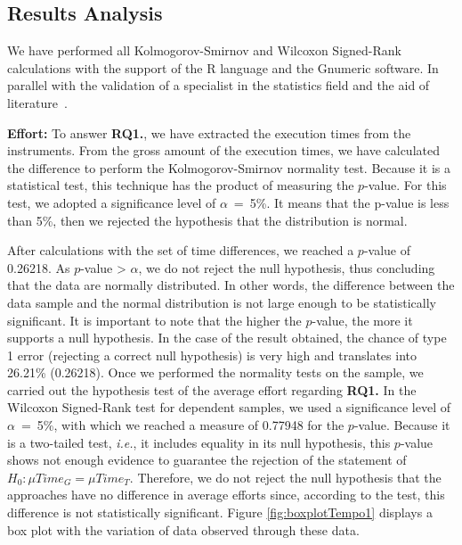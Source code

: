 \subsection{Results Analysis}
\label{ssec_experiments:preliminary_resultAnalysis}

We have performed all Kolmogorov-Smirnov and Wilcoxon Signed-Rank calculations with the support of the R language and the Gnumeric software. In parallel with the validation of a specialist in the statistics field and the aid of literature~\cite{Triola:2018}.

\textbf{Effort:} 
To answer \textbf{RQ1.},  
we have extracted the execution times from the instruments.
From the gross amount of the execution times, we have calculated the difference to perform the Kolmogorov-Smirnov normality test.
Because it is a statistical test, this technique has the product of measuring the $p$-value.
For this test, we adopted a significance level of $\alpha$~=~5\%.
It means that the p-value is less than 5\%, then we rejected the hypothesis that the distribution is normal.

After calculations with the set of time differences, we reached a $p$-value of 0.26218.
As $p$-value > $\alpha$, we do not reject the null hypothesis, thus concluding that the data are normally distributed.
In other words, the difference between the data sample and the normal distribution is not large enough to be statistically significant.
It is important to note that the higher the $p$-value, the more it supports a null hypothesis.
In the case of the result obtained, the chance of type 1 error (rejecting a correct null hypothesis) is very high and translates into 26.21\% (0.26218).
Once we performed the normality tests on the sample, we carried out the hypothesis test of the average effort regarding \textbf{RQ1.}
In the Wilcoxon Signed-Rank test for dependent samples, we used a significance level of $\alpha$~=~5\%, with which we reached a measure of 0.77948 for the $p$-value.
Because it is a two-tailed test, \textit{i.e.}, it includes equality in its null hypothesis, this $p$-value shows not enough evidence to guarantee the rejection of the statement of $H_0: \mu Time_G = \mu Time_T$.
Therefore, we do not reject the null hypothesis that the approaches have no difference in average efforts since, according to the test, this difference is not statistically significant. 
Figure \ref{fig:boxplotTempo1} displays a box plot with the variation of data observed through these data.

